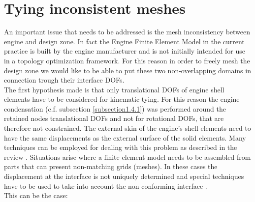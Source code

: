 \section{Tying inconsistent meshes}
\label{sec1.3}
An important issue that needs to be addressed is the mesh inconsistency between engine and design zone. In fact the Engine Finite Element Model in the current practice is built by the engine manufacturer and is not initially intended for use in a topology optimization framework. For this reason in order to freely mesh the design zone we would like to be able to put these two non-overlapping domains in connection trough their interface DOFs.\\
 The first hypothesis made is that only translational DOFs of engine shell elements have to be considered for kinematic tying. For this reason the engine condensation (c.f. subsection \ref{subsection1.4.1}) was performed around the retained nodes translational DOFs and not for rotational DOFs, that are therefore not constrained. The external skin of the engine's shell elements need to have the same displacements as the external surface of the solid elements. Many techniques can be employed for dealing with this problem as described in the review \cite{coniglio2018weighted}. Situations arise where a finite element model needs to be assembled from parts that can present non-matching grids (meshes). In these cases the displacement at the interface is not uniquely determined and special techniques have to be used to take into account the non-conforming interface \cite{mcgee2005non}. \\
 This can be the case:
